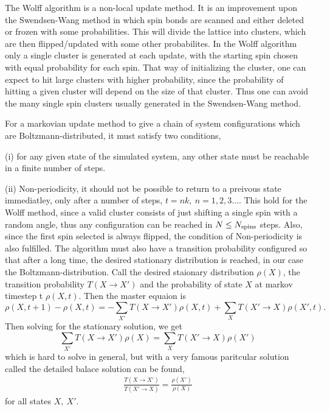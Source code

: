 The Wolff algorithm\cite{Wolff1989} is a non-local update method. It is an improvement upon the Swendsen-Wang method in which spin bonds are scanned and either deleted or frozen with some probabilities.
This will divide the lattice into clusters, which are then flipped/updated with some other probabilites.
In the Wolff algorithm only a single cluster is generated at each update, with the starting spin chosen with equal probability for each spin.
That way of initializing the cluster, one can expect to hit large clusters with higher probability, since the probability of hitting a given cluster will depend on the size of that cluster.
Thus one can avoid the many single spin clusters usually generated in the Swendsen-Wang method.

For a markovian update method to give a chain of system configurations which are Boltzmann-distributed, it must satisfy two conditions, 

(i) for any given state of the simulated system, any other state must be reachable in a finite number of steps.

(ii) Non-periodicity, it should not be possible to return to a preivous state immediatley, only after a number of steps, $t =nk,~ n = 1,2,3\dots$.
This hold for the Wolff method, since a valid cluster consists of just shifting a single spin with a random angle, thus any configuration can be reached in $N \leq N_{\textrm{spins}}$ steps.
Also, since the first spin selected is always flipped, the condition of Non-periodicity is also fulfilled.
The algorithm must also have a transition probability configured so that after a long time, the desired stationary distribution is reached, in our case the Boltzmann-distribution.
Call the desired staionary distribution $\rho(X)$, the transition probability $T(X \rightarrow X')$ and the probability of state $X$ at markov timestep t $\rho(X,t)$.
Then the master equaion is 
\begin{equation}
  \rho(X, t+1) - \rho(X,t) = -\sum_{X'} T(X\rightarrow X')\rho(X,t) +\sum_{X} T(X'\rightarrow X)\rho(X',t).
\end{equation}
Then solving for the stationary solution, we get
\begin{equation}
  \sum_{X'}T(X\rightarrow X') \rho(X) =  \sum_{X}T(X'\rightarrow X) \rho(X')
\end{equation}
which is hard to solve in general, but with a very famous paritcular solution called the detailed balace solution can be found,
\begin{align}
  \frac{T(X\rightarrow X')}{T(X'\rightarrow X)} = \frac{\rho(X')}{\rho(X)} 
  \label{eq:detbal}
\end{align}
for all states $X,~X'$.

